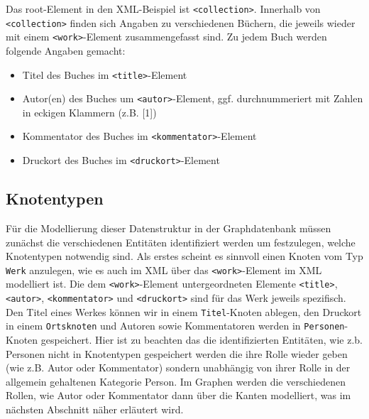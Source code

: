 \documentclass[12pt,ngerman,]{article}
\providecommand{\tightlist}{%
  \setlength{\itemsep}{0pt}\setlength{\parskip}{0pt}}
\begin{document}
Das root-Element in den XML-Beispiel ist
\texttt{\textless{}collection\textgreater{}}. Innerhalb von
\texttt{\textless{}collection\textgreater{}} finden sich Angaben zu
verschiedenen Büchern, die jeweils wieder mit einem
\texttt{\textless{}work\textgreater{}}-Element zusammengefasst sind. Zu
jedem Buch werden folgende Angaben gemacht:

\begin{itemize}
\tightlist
\item
  Titel des Buches im \texttt{\textless{}title\textgreater{}}-Element
\item
  Autor(en) des Buches um
  \texttt{\textless{}autor\textgreater{}}-Element, ggf. durchnummeriert
  mit Zahlen in eckigen Klammern (z.B. {[}1{]})
\item
  Kommentator des Buches im
  \texttt{\textless{}kommentator\textgreater{}}-Element
\item
  Druckort des Buches im
  \texttt{\textless{}druckort\textgreater{}}-Element
\end{itemize}

\subsection{Knotentypen}\label{knotentypen}

Für die Modellierung dieser Datenstruktur in der Graphdatenbank müssen
zunächst die verschiedenen Entitäten identifiziert werden um
festzulegen, welche Knotentypen notwendig sind. Als erstes scheint es
sinnvoll einen Knoten vom Typ \texttt{Werk} anzulegen, wie es auch im
XML über das \texttt{\textless{}work\textgreater{}}-Element im XML
modelliert ist. Die dem \texttt{\textless{}work\textgreater{}}-Element
untergeordneten Elemente \texttt{\textless{}title\textgreater{}},
\texttt{\textless{}autor\textgreater{}},
\texttt{\textless{}kommentator\textgreater{}} und
\texttt{\textless{}druckort\textgreater{}} sind für das Werk jeweils
spezifisch. Den Titel eines Werkes können wir in einem
\texttt{Titel}-Knoten ablegen, den Druckort in einem \texttt{Ortsknoten}
und Autoren sowie Kommentatoren werden in \texttt{Personen}-Knoten
gespeichert. Hier ist zu beachten das die identifizierten Entitäten, wie
z.b. Personen nicht in Knotentypen gespeichert werden die ihre Rolle
wieder geben (wie z.B. Autor oder Kommentator) sondern unabhängig von
ihrer Rolle in der allgemein gehaltenen Kategorie Person. Im Graphen
werden die verschiedenen Rollen, wie Autor oder Kommentator dann über
die Kanten modelliert, was im nächsten Abschnitt näher erläutert wird.
\end{document}
